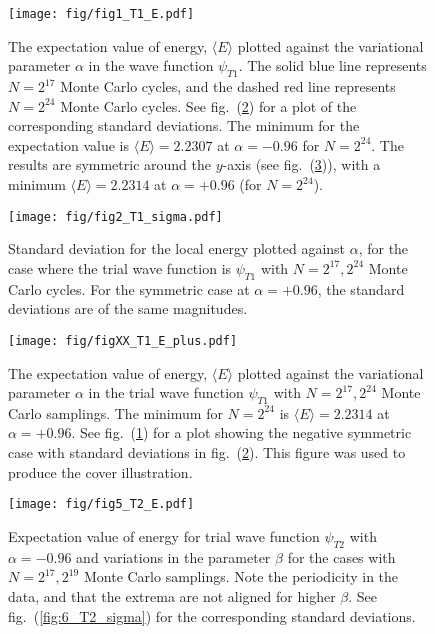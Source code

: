 \documentclass[a4paper,11pt]{article}
\begin{document}
\begin{figure}[htb]
    \centering
    \texttt{[image: fig/fig1\_T1\_E.pdf]}
    \caption{The expectation value of energy, $\langle E \rangle$ plotted against the variational parameter $\alpha$ in the wave function $\psi_{T1}$. The solid blue line represents $N=2^{17}$ Monte Carlo cycles, and the dashed red line represents $N=2^{24}$ Monte Carlo cycles. See fig.~(\ref{fig:2_T1_sigma}) for a plot of the corresponding standard deviations. The minimum for the expectation value is $\langle E \rangle = 2.2307$ at $\alpha = -0.96$ for $N=2^{24}$. The results are symmetric around the $y$-axis (see fig.~(\ref{fig:XX_T1_E_plus})), with a minimum $\langle E \rangle = 2.2314$ at $\alpha = +0.96$ (for $N=2^{24}$).}
    \label{fig:2_T1_E}
\end{figure}

\begin{figure}[htpb]
    \centering
    \texttt{[image: fig/fig2\_T1\_sigma.pdf]}
    \caption{Standard deviation for the local energy plotted against $\alpha$, for the case where the trial wave function is $\psi_{T1}$ with $N=2^{17}, 2^{24}$ Monte Carlo cycles. For the symmetric case at $\alpha = +0.96$, the standard deviations are of the same magnitudes. }
    \label{fig:2_T1_sigma}
\end{figure}

\begin{figure}[htpb]
    \centering
    \texttt{[image: fig/figXX\_T1\_E\_plus.pdf]}
    \caption{The expectation value of energy, $\langle E \rangle$ plotted against the variational parameter $\alpha$ in the trial wave function $\psi_{T1}$ with $N=2^{17}, 2^{24}$ Monte Carlo samplings. The minimum for $N=2^{24}$ is $\langle E \rangle = 2.2314$ at $\alpha=+0.96$. See fig.~(\ref{fig:2_T1_E}) for a plot showing the negative symmetric case with standard deviations in fig.~(\ref{fig:2_T1_sigma}). This figure was used to produce the cover illustration. }
    \label{fig:XX_T1_E_plus}
\end{figure}

\begin{figure}[htpb]
    \centering
    \texttt{[image: fig/fig5\_T2\_E.pdf]}
    \caption{Expectation value of energy for trial wave function $\psi_{T2}$ with $\alpha = -0.96$ and variations in the parameter $\beta$ for the cases with $N=2^{17}, 2^{19}$ Monte Carlo samplings. Note the periodicity in the data, and that the extrema are not aligned for higher $\beta$. See fig.~(\ref{fig:6_T2_sigma}) for the corresponding standard deviations.}
    \label{fig:5_T2_E}
\end{figure}
\end{document}
